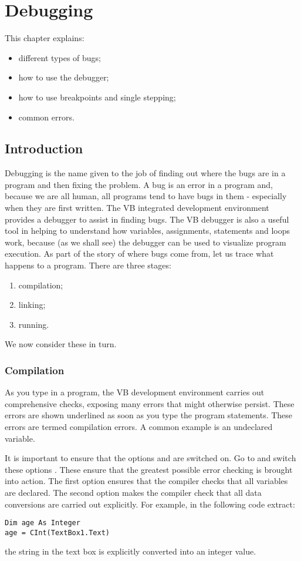 \chapter{Debugging}
 \label{ch:debugging}

	This chapter explains:
	\begin{itemize}
    \item different types of bugs;
    \item how to use the debugger;
    \item how to use breakpoints and single stepping;
  	\item common errors.
	\end{itemize}

	
  \section{Introduction}
		Debugging is the name given to the job of finding out where the bugs are in a program and then fixing the problem. A bug is an error in a program and, because we are all human, all programs tend to have bugs in them - especially when they are first written. The VB integrated development environment provides a debugger to assist in finding bugs.
		The VB debugger is also a useful tool in helping to understand how variables, assignments,  statements and loops work, because (as we shall see) the debugger can be used to visualize program execution.
As part of the story of where bugs come from, let us trace what happens to a program. There are three stages:
		\begin{enumerate}
			\item	compilation;
			\item linking;
			\item running.
		\end{enumerate}
	We now consider these in turn.


		\subsection*{Compilation}
			As you type in a program, the VB development environment carries out comprehensive checks, exposing many errors that might otherwise persist. These errors are shown underlined as soon as you type the program statements. These errors are termed compilation errors. A common example is an undeclared variable.
			
			It is important to ensure that the options  and  are switched on. Go to  and switch these options . These ensure that the greatest possible error checking is brought into action. The first option ensures that the compiler checks that all variables are declared. The second option makes the compiler check that all data conversions are carried out explicitly. For example, in the following code extract:
			\begin{lstlisting}
Dim age As Integer
age = CInt(TextBox1.Text)
			\end{lstlisting}
			the string in the text box is explicitly converted into an integer value.
			
